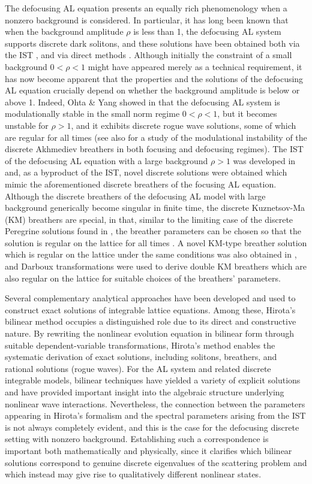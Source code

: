 \documentclass{article}
\begin{document}
The defocusing AL equation presents an equally rich phenomenology when a nonzero background is considered. 
In particular, it has long been known that when the background amplitude $\rho$ is less than 1, the defocusing AL system supports discrete dark solitons, and these solutions have been obtained both via the IST \cite{KV92,ABP07}, and via direct methods \cite{Ohta00,MO06}.  Although initially the constraint of a small background $0<\rho<1$ might have appeared merely as a technical requirement, it has now become apparent that the properties and the solutions of the defocusing AL equation crucially depend on whether the background amplitude is below or above 1. 
Indeed, Ohta \& Yang showed in \cite{OY14} that the defocusing AL system is modulationally stable in the small norm regime $0<\rho<1$, but it becomes unstable for $\rho>1$, and it exhibits discrete rogue wave solutions, some of which are regular for all times (see also \cite{CS24} for a study of the modulational instability of the discrete Akhmediev breathers in both focusing and defocusing regimes). The IST of the defocusing AL equation with a large background $\rho>1$ was developed in \cite{OP19} and, as a byproduct of the IST, novel discrete solutions were obtained which mimic the aforementioned discrete breathers of the focusing AL equation. Although the discrete breathers of the defocusing AL model with large background generically become singular in finite time, the discrete Kuznetsov-Ma (KM) breathers are special, in that, similar to the limiting case of the discrete Peregrine solutions found in \cite{OY14}, the breather parameters can be chosen so that the solution is regular on the lattice for all times \cite{WM25}. A novel KM-type breather solution which is regular on the lattice under the same conditions was also obtained in \cite{WM25}, and Darboux transformations were used to derive double KM breathers which are also regular on the lattice for suitable choices of the breathers' parameters.

Several complementary analytical approaches have been developed and used to construct exact solutions of integrable lattice equations. Among these, Hirota’s bilinear method occupies a distinguished role due to its direct and constructive nature. By rewriting the nonlinear evolution equation in bilinear form through suitable dependent-variable transformations, Hirota’s method enables the systematic derivation of exact solutions, including solitons, breathers, and rational solutions (rogue waves). For the AL system and related discrete integrable models, bilinear techniques have yielded a variety of explicit solutions and have provided important insight into the algebraic structure underlying nonlinear wave interactions. Nevertheless, the connection between the parameters appearing in Hirota’s formalism and the spectral parameters arising from the IST is not always completely evident, and this is the case for the defocusing discrete setting with nonzero background. Establishing such a correspondence is important both mathematically and physically, since it clarifies which bilinear solutions correspond to genuine discrete eigenvalues of the scattering problem and which instead may give rise to qualitatively different nonlinear states.
\end{document}
